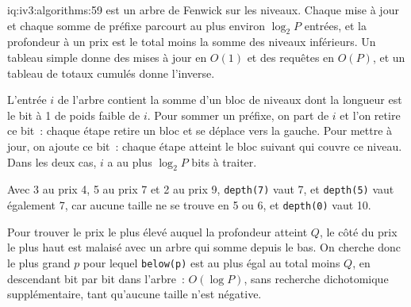 \begin{solution}{iq:iv3:algorithms:59}
 est un arbre de Fenwick sur les niveaux. Chaque mise à jour et chaque somme de préfixe parcourt au plus environ $\log_2 P$ entrées, et la profondeur à un prix est le total moins la somme des niveaux inférieurs. Un tableau simple donne des mises à jour en $O(1)$ et des requêtes en $O(P)$, et un tableau de totaux cumulés donne l'inverse.
\label{lst:iv3:al:fenwick}

L'entrée $i$ de l'arbre contient la somme d'un bloc de niveaux dont la longueur est le bit à 1 de poids faible de $i$. Pour sommer un préfixe, on part de $i$ et l'on retire ce bit~: chaque étape retire un bloc et se déplace vers la gauche. Pour mettre à jour, on ajoute ce bit~: chaque étape atteint le bloc suivant qui couvre ce niveau. Dans les deux cas, $i$ a au plus $\log_2 P$ bits à traiter.

Avec 3 au prix 4, 5 au prix 7 et 2 au prix 9, \texttt{depth(7)} vaut 7, et \texttt{depth(5)} vaut également 7, car aucune taille ne se trouve en 5 ou 6, et \texttt{depth(0)} vaut 10.

Pour trouver le prix le plus élevé auquel la profondeur atteint $Q$, le côté du prix le plus haut est malaisé avec un arbre qui somme depuis le bas. On cherche donc le plus grand $p$ pour lequel \texttt{below(p)} est au plus égal au total moins $Q$, en descendant bit par bit dans l'arbre~: $O(\log P)$, sans recherche dichotomique supplémentaire, tant qu'aucune taille n'est négative.

\end{solution}

